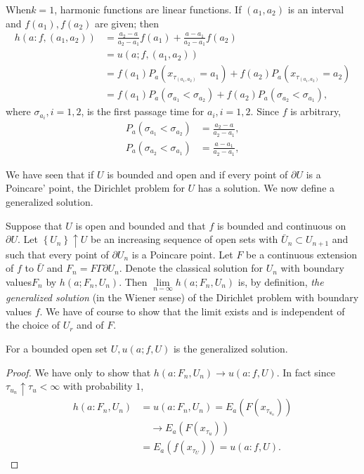 \begin{remark*}
When\pageoriginale $k=1$, harmonic functions are linear functions. If
$(a_1, a_2)$ is an interval and $f(a_1), f(a_2)$ are given; then  
  \begin{align*}
    h(a:f, (a_1,a_2)) & = \frac{a_2
      -a}{a_2-a_1}f(a_1)+\frac{a-a_1}{a_2-a_1}f(a_2)\\ 
    & = u(a;f,(a_1, a_2))\\
    & = f(a_1)P_a(x_{\tau_{(a_1, a_2)}}= a_1) +f(a_2) P_a(x_{\tau_{(a_1, a_2)}}=a_2)\\
    & = f(a_1) P_a (\sigma_{a_1}< \sigma_{a_2})+f(a_2) P_a
    (\sigma_{a_2} < \sigma_{a_1}), 
  \end{align*}
  where $\sigma_{a_i}, i=1, 2$, is the first passage time for $a_i, i=1,
  2$. Since $f$ is arbitrary, 
  \begin{align*}
    P_a(\sigma_{a_1}< \sigma_{a_2}) & = \frac{a_2 -a}{a_2 - a_1},\\
    P_a(\sigma_{a_2}< \sigma_{a_1}) & = \frac{a -a_1}{a_2 - a_1},
  \end{align*}
\end{remark*}

We have seen that if $U$ is bounded and open and if every point of
$\partial U$ is a Poincare' point, the Dirichlet problem for $U$ has a
solution. We now define a generalized solution. 

Suppose that $U$ is open and bounded and that $f$ is bounded and
continuous on $\partial U$. Let $\left\{U_n \right\} \uparrow U$ be an
increasing sequence of open sets with $\bar{U}_n \subset U_{n+1}$ and
such that every point of $\partial U_n$ is a Poincare point. Let $F$
be a continuous extension of $f$ to $\bar{U}$ and $F_n = F \Gamma
\partial U_n$. Denote the classical solution for $U_n$ with boundary
values\pageoriginale $F_n$ by $h(a; F_n,U_n)$. Then $\lim\limits_{n -
  \infty} h (a; F_n , U_n)$ is, by definition, \textit{the generalized
  solution} (in the Wiener sense) of the Dirichlet problem with
boundary values $f$. We have of course to show that the limit exists
and is independent of the choice of $U_r$ and of $F$. 

\begin{thm}\label{chap3-sec3-thm10}%
  For a bounded open set $U, u(a;f,U)$ is the generalized solution.
\end{thm}

\begin{proof}
We have only to show that $h(a:F_n, U_n) \to u(a:f,U)$. In fact
since $\tau_{u_n}\uparrow \tau_u < \infty$ with probability $1$, 
  \begin{align*}
    h(a: F_n, U_n) & = u(a:F_n,U_n) = E_a(F(x_{\tau_{u_n}}))\\
    &\quad \to E_a (F(x_{\tau_u}))\\
    & = E_a (f(x_{\tau_U})) = u(a: f,U).
  \end{align*}
\end{proof}

